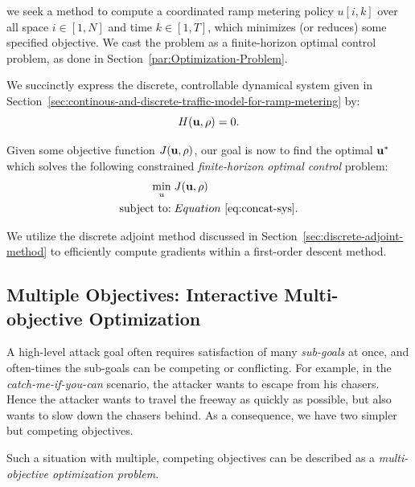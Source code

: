 we seek a method to compute a coordinated ramp metering policy $u\left[i,k\right]$ over all space $i\in\left[1,N\right]$ and time $k\in\left[1,T\right]$, which minimizes (or reduces) some specified objective. We cast the problem as a finite-horizon optimal control problem, as done in Section~\ref{par:Optimization-Problem}.

We succinctly express the discrete, controllable dynamical system given in Section~\ref{sec:continous-and-discrete-traffic-model-for-ramp-metering} by:
	\begin{equation}
	\label{eq:concat-sys}
		H\left(\vectorize{u}, \vectorize{\rho}\right)=0.
	\end{equation}

Given some objective function $J\left(\vectorize{u}, \vectorize{\rho}\right)$, our goal is now to find the optimal $\mathbf{u}^*$ which solves the following constrained \emph{finite-horizon optimal control} problem:
	\begin{align}
		\label{eqn:fhoc}
		\min_{u} \;& J\left(\vectorize{u}, \vectorize{\rho}\right) \\
		\text{subject to:} \;& Equation~\eqref{eq:concat-sys} \label{eqn:repeat-concat-system}.
	\end{align}

We utilize the discrete adjoint method discussed in Section~\ref{sec:discrete-adjoint-method} to efficiently compute gradients within a first-order descent method.

\subsection{Multiple Objectives: Interactive Multi-objective Optimization}
	\label{sub:moo}
		A high-level attack goal often requires satisfaction of many \emph{sub-goals} at once, and often-times the sub-goals can be competing or conflicting. For example, in the \emph{catch-me-if-you-can} scenario, the attacker wants to escape from his chasers. Hence the attacker wants to travel the freeway as quickly as possible, but also wants to slow down the chasers behind. As a consequence, we have two simpler but competing objectives.

		Such a situation with multiple, competing objectives can be described as a \emph{multi-objective optimization problem}.

